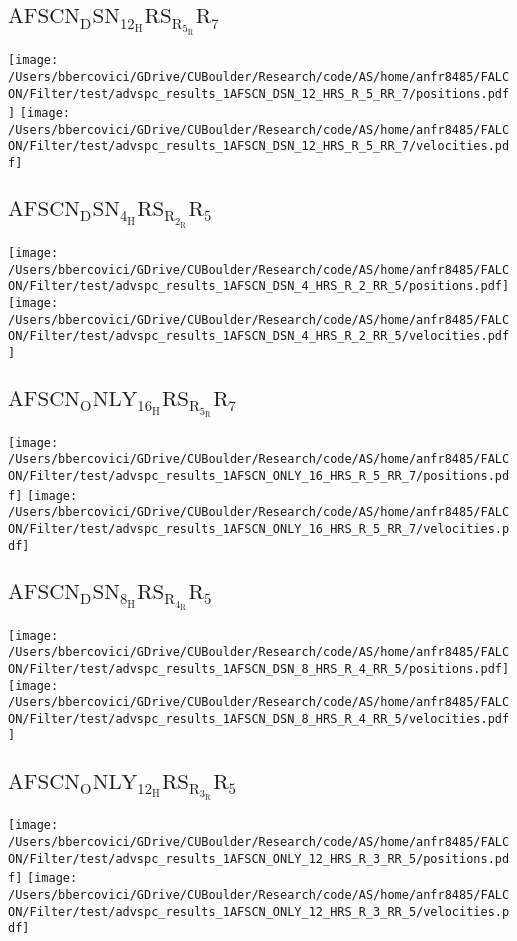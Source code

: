 \subsection{$\mathrm{AFSCN_DSN_12_HRS_R_5_RR_7}$}
\texttt{[image: /Users/bbercovici/GDrive/CUBoulder/Research/code/AS/home/anfr8485/FALCON/Filter/test/advspc\_results\_1AFSCN\_DSN\_12\_HRS\_R\_5\_RR\_7/positions.pdf]}
\texttt{[image: /Users/bbercovici/GDrive/CUBoulder/Research/code/AS/home/anfr8485/FALCON/Filter/test/advspc\_results\_1AFSCN\_DSN\_12\_HRS\_R\_5\_RR\_7/velocities.pdf]}
\subsection{$\mathrm{AFSCN_DSN_4_HRS_R_2_RR_5}$}
\texttt{[image: /Users/bbercovici/GDrive/CUBoulder/Research/code/AS/home/anfr8485/FALCON/Filter/test/advspc\_results\_1AFSCN\_DSN\_4\_HRS\_R\_2\_RR\_5/positions.pdf]}
\texttt{[image: /Users/bbercovici/GDrive/CUBoulder/Research/code/AS/home/anfr8485/FALCON/Filter/test/advspc\_results\_1AFSCN\_DSN\_4\_HRS\_R\_2\_RR\_5/velocities.pdf]}
\subsection{$\mathrm{AFSCN_ONLY_16_HRS_R_5_RR_7}$}
\texttt{[image: /Users/bbercovici/GDrive/CUBoulder/Research/code/AS/home/anfr8485/FALCON/Filter/test/advspc\_results\_1AFSCN\_ONLY\_16\_HRS\_R\_5\_RR\_7/positions.pdf]}
\texttt{[image: /Users/bbercovici/GDrive/CUBoulder/Research/code/AS/home/anfr8485/FALCON/Filter/test/advspc\_results\_1AFSCN\_ONLY\_16\_HRS\_R\_5\_RR\_7/velocities.pdf]}
\subsection{$\mathrm{AFSCN_DSN_8_HRS_R_4_RR_5}$}
\texttt{[image: /Users/bbercovici/GDrive/CUBoulder/Research/code/AS/home/anfr8485/FALCON/Filter/test/advspc\_results\_1AFSCN\_DSN\_8\_HRS\_R\_4\_RR\_5/positions.pdf]}
\texttt{[image: /Users/bbercovici/GDrive/CUBoulder/Research/code/AS/home/anfr8485/FALCON/Filter/test/advspc\_results\_1AFSCN\_DSN\_8\_HRS\_R\_4\_RR\_5/velocities.pdf]}
\subsection{$\mathrm{AFSCN_ONLY_12_HRS_R_3_RR_5}$}
\texttt{[image: /Users/bbercovici/GDrive/CUBoulder/Research/code/AS/home/anfr8485/FALCON/Filter/test/advspc\_results\_1AFSCN\_ONLY\_12\_HRS\_R\_3\_RR\_5/positions.pdf]}
\texttt{[image: /Users/bbercovici/GDrive/CUBoulder/Research/code/AS/home/anfr8485/FALCON/Filter/test/advspc\_results\_1AFSCN\_ONLY\_12\_HRS\_R\_3\_RR\_5/velocities.pdf]}
